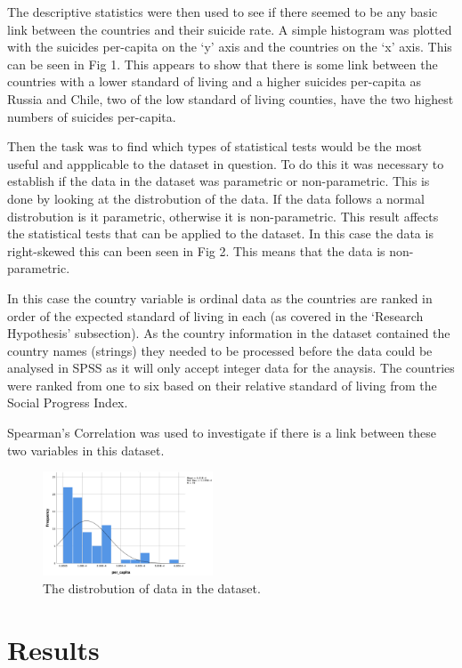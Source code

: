 \documentclass[conference]{IEEEtran}
\begin{document}
The descriptive statistics were then used to see if there seemed to be any basic link between the countries and their suicide rate.
A simple histogram was plotted with the suicides per-capita on the `y' axis and the countries on the `x' axis.
This can be seen in Fig 1.
This appears to show that there is some link between the countries with a lower standard of living and a higher suicides per-capita as
Russia and Chile, two of the low standard of living counties, have the two highest numbers of suicides per-capita.

Then the task was to find which types of statistical tests would be the most useful and appplicable to the dataset in question.
To do this it was necessary to establish if the data in the dataset was parametric or non-parametric.
This is done by looking at the distrobution of the data. If the data follows a normal distrobution is it parametric, otherwise it is non-parametric.
This result affects the statistical tests that can be applied to the dataset.
In this case the data is right-skewed this can been seen in Fig 2. This means that the data is non-parametric.

In this case the country variable is ordinal data as the countries are ranked in order of the expected standard of living in each (as covered in the `Research Hypothesis' subsection).
As the country information in the dataset contained the country names (strings) they needed to be processed before the data could be analysed in SPSS as it will only accept integer data for the anaysis.
The countries were ranked from one to six based on their relative standard of living from the Social Progress Index.

Spearman's Correlation was used to investigate if there is a link between these two variables in this dataset.

    \begin{figure}[t]
        \centering
        \includegraphics[width=0.45\textwidth]{skewed}
        \caption{The distrobution of data in the dataset.}
    \end{figure}

\section{Results}
\end{document}
